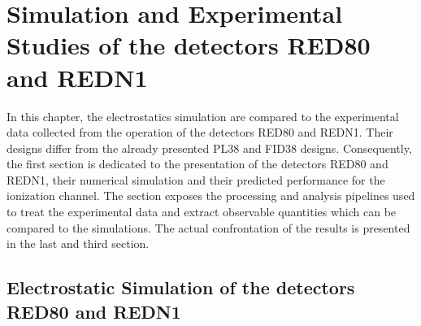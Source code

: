 
\chapter{Simulation and Experimental Studies of the detectors RED80 and REDN1} %

\label{ChapterElectrodesExperimental} %



In this chapter, the electrostatics simulation are compared to the experimental data collected from the operation of the detectors RED80 and REDN1.
Their designs differ from the already presented PL38 and FID38 designs.
Consequently, the first section is dedicated to the presentation of the detectors RED80 and REDN1, their numerical simulation and their predicted performance for the ionization channel.
The section exposes the processing and analysis pipelines used to treat the experimental data and extract observable quantities which can be compared to the simulations.
The actual confrontation of the results is presented in the last and third section.


\section{Electrostatic Simulation of the detectors RED80 and REDN1}

